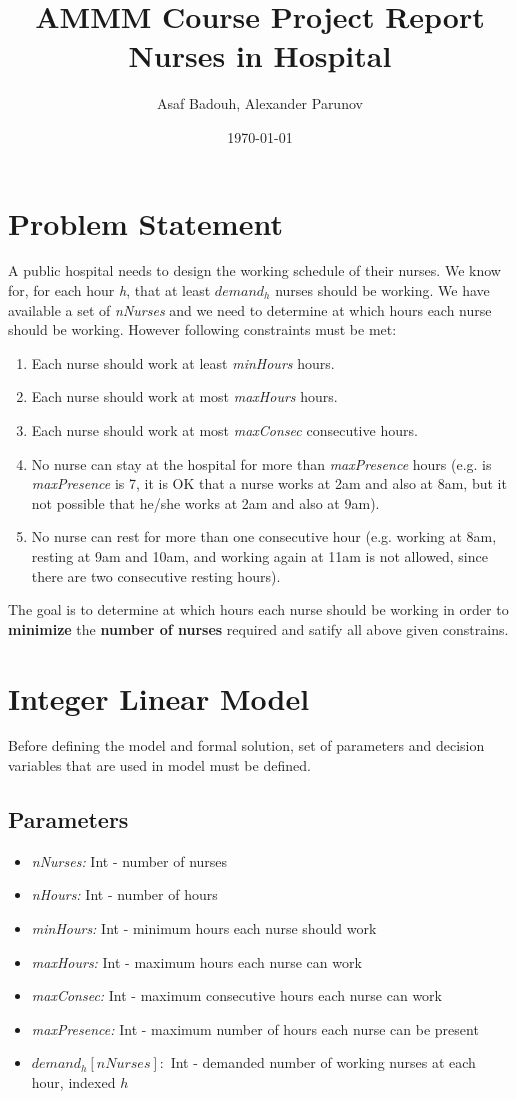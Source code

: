 \documentclass{article}
\author{Asaf Badouh, Alexander Parunov}
\title{AMMM Course Project Report\\ \textbf{Nurses in Hospital}}
\date{\today}
\newcommand\tab[1][1cm]{\hspace*{#1}}
\begin{document}
	\maketitle
	\pagebreak
	
	\section{Problem Statement}
\tab A public hospital needs to design the working schedule of their nurses. We know for, for each hour \textit{h}, that at least $demand_h$ nurses should be working. We have available a set of \textit{nNurses} and we need to determine at which hours each nurse should be working. However following constraints must be met:
	\begin{enumerate}
		\item Each nurse should work at least \textit{minHours} hours.
		\item Each nurse should work at most \textit{maxHours} hours.
		\item Each nurse should work at most \textit{maxConsec} consecutive hours.
		\item No nurse can stay at the hospital for more than \textit{maxPresence} hours (e.g. is \textit{maxPresence} is 7, it is OK that a nurse works at 2am and also at 8am, but it not possible that he/she works at 2am and also at 9am).
		\item No nurse can rest for more than one consecutive hour (e.g. working at 8am, resting at 9am and 10am, and working again at 11am is not allowed, since there are two consecutive resting hours).
	\end{enumerate}
\tab The goal is to determine at which hours each nurse should be working in order to \textbf{minimize} the \textbf{number of nurses} required and satify all above given constrains.
	\section{Integer Linear Model}
\tab Before defining the model and formal solution, set of parameters and decision variables that are used in model must be defined.
	\subsection{Parameters}
	\begin{itemize}
		\item \textit{nNurses:} Int - number of nurses
		\item \textit{nHours:} Int - number of hours
		\item \textit{minHours:} Int - minimum hours each nurse should work
		\item \textit{maxHours:} Int - maximum hours each nurse can work
		\item \textit{maxConsec:} Int - maximum consecutive hours each nurse can work
		\item \textit{maxPresence:} Int - maximum number of hours each nurse can be present
		\item $demand_h[nNurses]:$ Int - demanded number of working nurses at each hour, indexed $h$
	\end{itemize}
	
\end{document}
